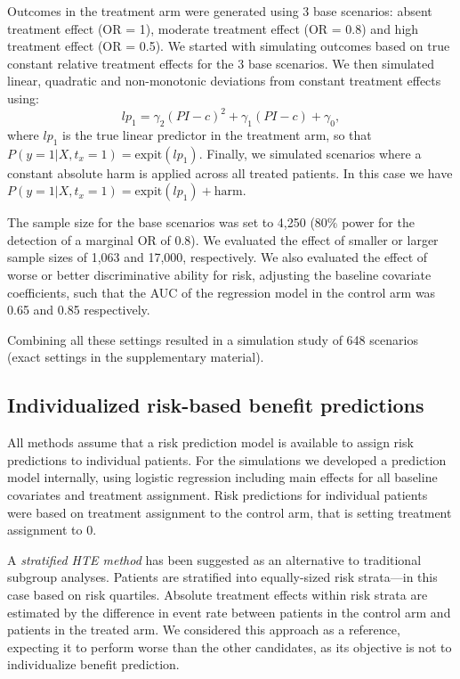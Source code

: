 \documentclass{article}
\begin{document}
Outcomes in the treatment arm were generated using 3 base scenarios:
absent treatment effect (OR = 1), moderate treatment effect (OR = 0.8)
and high treatment effect (OR = 0.5). We started with simulating
outcomes based on true constant relative treatment effects for the 3
base scenarios. We then simulated linear, quadratic and non-monotonic
deviations from constant treatment effects using:
\[lp_1 = \gamma_2(PI-c)^2 + \gamma_1(PI-c) + \gamma_0, \] where \(lp_1\)
is the true linear predictor in the treatment arm, so that
\(P(y=1|X, t_x=1) = \text{expit}(lp_1)\). Finally, we simulated
scenarios where a constant absolute harm is applied across all treated
patients. In this case we have
\(P(y=1|X,t_x=1) = \text{expit}(lp_1) + \text{harm}\).

The sample size for the base scenarios was set to 4,250 (\(80\%\) power
for the detection of a marginal OR of 0.8). We evaluated the effect of
smaller or larger sample sizes of 1,063 and 17,000, respectively. We
also evaluated the effect of worse or better discriminative ability for
risk, adjusting the baseline covariate coefficients, such that the AUC
of the regression model in the control arm was 0.65 and 0.85
respectively.

Combining all these settings resulted in a simulation study of 648
scenarios (exact settings in the supplementary material).

\hypertarget{individualized-risk-based-benefit-predictions}{%
\subsection{Individualized risk-based benefit
predictions}\label{individualized-risk-based-benefit-predictions}}

All methods assume that a risk prediction model is available to assign
risk predictions to individual patients. For the simulations we
developed a prediction model internally, using logistic regression
including main effects for all baseline covariates and treatment
assignment. Risk predictions for individual patients were based on
treatment assignment to the control arm, that is setting treatment
assignment to 0.

A \emph{stratified HTE method} has been suggested as an alternative to
traditional subgroup analyses. Patients are stratified into
equally-sized risk strata---in this case based on risk quartiles.
Absolute treatment effects within risk strata are estimated by the
difference in event rate between patients in the control arm and
patients in the treated arm. We considered this approach as a reference,
expecting it to perform worse than the other candidates, as its
objective is not to individualize benefit prediction.
\end{document}
